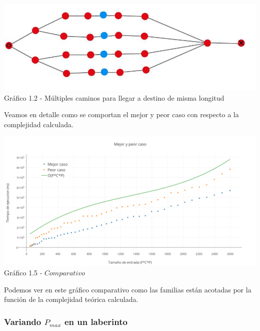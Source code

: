 \vspace*{0.3cm} \vspace*{0.3cm}
  \begin{center}
\includegraphics[scale=0.7]{./EJ1/ej1grafopeorcaso.jpeg}
{Gr\'afico 1.2 - Múltiples caminos para llegar a destino de misma longitud}
  \end{center}
  \vspace*{0.3cm}

Veamos en detalle como se comportan el mejor y peor caso con respecto a la complejidad calculada.\\

  \vspace*{0.3cm} \vspace*{0.3cm}
  \begin{center}
\includegraphics[scale=0.5]{./EJ1/MejorYPeorCaso.png}
{Gr\'afico 1.5 - $Comparativo$}
  \end{center}
  \vspace*{0.3cm}
  
Podemos ver en este gr\'afico comparativo como las familias est\'an acotadas por la funci\'on de la complejidad te\'orica calculada.\\

\subsubsection*{Variando $P_{max}$ en un laberinto}

